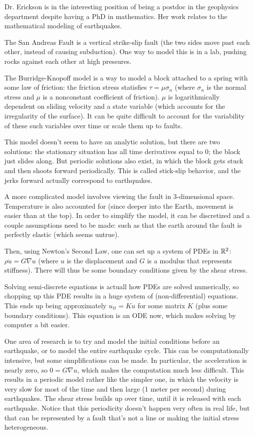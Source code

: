 Dr. Erickson is in the interesting position of being a postdoc in the geophysics department despite having a PhD in mathematics. Her work relates to the mathematical modeling of earthquakes.

The San Andreas Fault is a vertical strike-slip fault (the two sides move past each other, instead of causing subduction). One way to model this is in a lab, pushing rocks against each other at high pressures.

The Burridge-Knopoff model is a way to model a block attached to a spring with some law of friction: the friction stress statisfies $\tau = \mu\sigma_n$ (where $\sigma_n$ is the normal stress and $\mu$ is a nonconstant coefficient of friction). $\mu$ is logarithmically dependent on sliding velocity and a state variable (which accounts for the irregularity of the surface). It can be quite difficult to account for the variability of these such variables over time or scale them up to faults.

This model doesn't seem to have an analytic solution, but there are two solutions: the stationary situation has all time derivatives equal to 0; the block just slides along. But periodic solutions also exist, in which the block gets stuck and then shoots forward periodically. This is called stick-slip behavior, and the jerks forward actually correspond to earthquakes.

A more complicated model involves viewing the fault in 3-dimensional space. Temperature is also accounted for (since deeper into the Earth, movement is easier than at the top). In order to simplify the model, it can be discretized and a couple assumptions need to be made: such as that the earth around the fault is perfectly elastic (which seems untrue).

Then, using Newton's Second Law, one can set up a system of PDEs in $\mathbb{R}^2$: $\rho\ddot u = G\nabla u$ (where $u$ is the displacement and $G$ is a modulus that represents stiffness). There will thus be some boundary conditions given by the shear stress.

Solving semi-discrete equations is actuall how PDEs are solved numerically, so chopping up this PDE results in a huge system of (non-differential) equations. This ends up being approximately $u_{tt} = Ku$ for some matrix $K$ (plus some boundary conditions). This equation is an ODE now, which makes solving by computer a bit easier.

One area of research is to try and model the initial conditions before an earthquake, or to model the entire earthquake cycle. This can be computationally intensive, but some simplifications can be made. In particular, the acceleration is nearly zero, so $0 = G\nabla u$, which makes the computation much less difficult. This results in a periodic model rather like the simpler one, in which the velocity is very slow for most of the time and then large (1 meter per second) during earthquakes. The shear stress builds up over time, until it is released with each earthquake. Notice that this periodicity doesn't happen very often in real life, but that can be represented by a fault that's not a line or making the initial stress heterogeneous.

